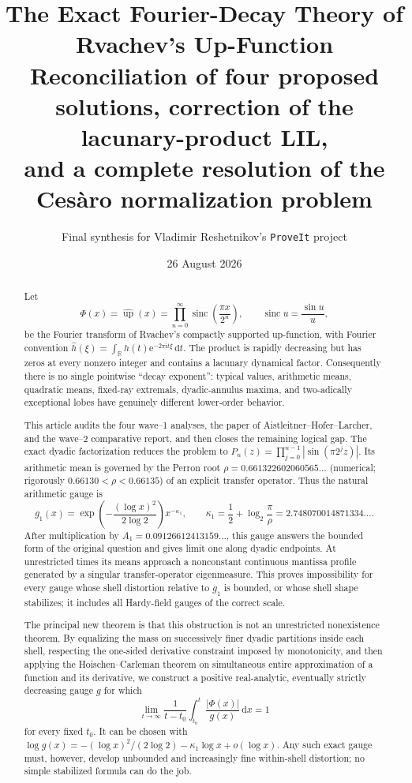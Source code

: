 \documentclass[11pt,oneside]{article}
\title{\bfseries The Exact Fourier-Decay Theory of Rvachev's Up-Function\\[0.35em]
\large Reconciliation of four proposed solutions, correction of the lacunary-product LIL,\\
and a complete resolution of the Ces\`aro normalization problem}
\author{Final synthesis for Vladimir Reshetnikov's \texttt{ProveIt} project}
\date{26 August 2026}
\theoremstyle{definition}
\theoremstyle{remark}
\newcommand{\R}{\mathbb R}
\newcommand{\e}{\mathrm e}
\newcommand{\ii}{\mathrm i}
\newcommand{\dd}{\,\mathrm d}
\newcommand{\Up}{\operatorname{up}}
\newcommand{\sinc}{\operatorname{sinc}}
\begin{document}
\maketitle

\begin{abstract}
Let
\[
 \Phi(x)=\widehat{\Up}(x)
 =\prod_{n=0}^{\infty}\sinc\!\left(\frac{\pi x}{2^n}\right),
 \qquad \sinc u=\frac{\sin u}{u},
\]
be the Fourier transform of Rvachev's compactly supported up-function, with
Fourier convention \(\widehat h(\xi)=\int_{\R}h(t)\e^{-2\pi\ii t\xi}\dd t\).
The product is rapidly decreasing but has zeros at every nonzero integer and
contains a lacunary dynamical factor.  Consequently there is no single
pointwise ``decay exponent'': typical values, arithmetic means, quadratic
means, fixed-ray extremals, dyadic-annulus maxima, and two-adically exceptional
lobes have genuinely different lower-order behavior.

This article audits the four wave--1 analyses, the paper of
Aistleitner--Hofer--Larcher, and the wave--2 comparative report, and then closes
the remaining logical gap.  The exact dyadic factorization reduces the problem
to
\(P_n(z)=\prod_{j=0}^{n-1}|\sin(\pi2^jz)|\).  Its arithmetic mean is governed by
the Perron root
\(\rho=0.661322602060565\ldots\) (numerical; rigorously
\(0.66130<\rho<0.66135\)) of an explicit transfer operator.  Thus the natural
arithmetic gauge is
\[
 g_1(x)=\exp\!\left(-\frac{(\log x)^2}{2\log2}\right)x^{-\kappa_1},
 \qquad
 \kappa_1=\frac12+\log_2\frac{\pi}{\rho}
 =2.748070014871334\ldots .
\]
After multiplication by
\(A_1=0.09126612413159\ldots\), this gauge answers the bounded form of the
original question and gives limit one along dyadic endpoints.  At unrestricted
times its means approach a nonconstant continuous mantissa profile generated by
a singular transfer-operator eigenmeasure.  This proves impossibility for every
gauge whose shell distortion relative to \(g_1\) is bounded, or whose shell
shape stabilizes; it includes all Hardy-field gauges of the correct scale.

The principal new theorem is that this obstruction is not an unrestricted
nonexistence theorem.  By equalizing the mass on successively finer dyadic
partitions inside each shell, respecting the one-sided derivative constraint
imposed by monotonicity, and then applying the Hoischen--Carleman theorem on
simultaneous entire approximation of a function and its derivative, we
construct a positive real-analytic, eventually strictly decreasing gauge
\(g\) for which
\[
 \lim_{t\to\infty}\frac1{t-t_0}\int_{t_0}^t\frac{|\Phi(x)|}{g(x)}\dd x=1
\]
for every fixed \(t_0\).  It can be chosen with
\(\log g(x)=-(\log x)^2/(2\log2)-\kappa_1\log x+o(\log x)\).
Any such exact gauge must, however, develop unbounded and increasingly fine
within-shell distortion; no simple stabilized formula can do the job.


\end{abstract}
\end{document}
